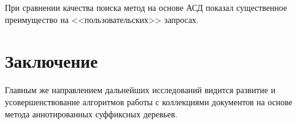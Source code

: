 \documentclass[12pt]{report}
\begin{document}
При сравнении качества поиска метод на основе АСД показал существенное преимущество на <<пользовательских>> запросах.



\chapter*{Заключение}


Главным же направлением дальнейших исследований видится развитие и усовершенствование алгоритмов работы с коллекциями документов на основе метода аннотированных суффиксных деревьев.


\newpage

\renewcommand{\bibname}{Библиографический список использованной литературы}
\end{document}
